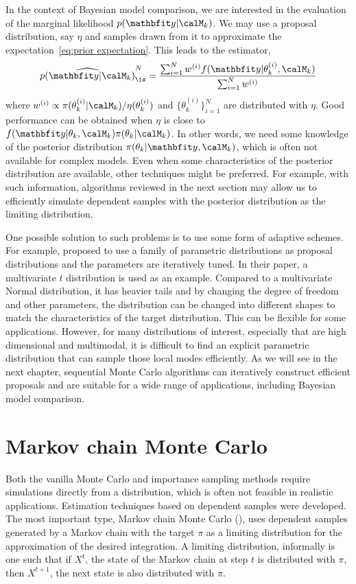 In the context of Bayesian model comparison, we are interested in the evaluation of the marginal likelihood $p(\data|\calM_k)$. We may use a proposal distribution, say $\eta$ and samples drawn from it to approximate the expectation~\eqref{eq:prior expectation}. This leads to the estimator,
\begin{equation}
  \widehat{p(\data|\calM_k)}_{\is}^N =
  \frac{\sum_{i=1}^N w^{(i)} f(\data|\theta_k^{(i)},\calM_k)}
  {\sum_{i=1}^N w^{(i)}}
\end{equation}
where $w^{(i)}\propto\pi(\theta_k^{(i)}|\calM_k)/\eta(\theta_k^{(i)})$ and $\{\theta_k^{(i)}\}_{i=1}^N$ are distributed with $\eta$. Good performance can be obtained when $\eta$ is close to $f(\data|\theta_k,\calM_k)\pi(\theta_k|\calM_k)$. In other words, we need some knowledge of the posterior distribution $\pi(\theta_k|\data,\calM_k)$, which is often not available for complex models. Even when some characteristics of the posterior distribution are available, other techniques might be preferred. For example, with such information, algorithms reviewed in the next section may allow us to efficiently simulate dependent samples with the posterior distribution as the limiting distribution.

One possible solution to such problems is to use some form of adaptive schemes. For example, \cite{ManSuk:1992vx} proposed to use a family of parametric distributions as proposal distributions and the parameters are iteratively tuned. In their paper, a multivariate $t$ distribution is used as an example. Compared to a multivariate Normal distribution, it has heavier tails and by changing the degree of freedom and other parameters, the distribution can be changed into different shapes to match the characteristics of the target distribution. This can be flexible for some applications. However, for many distributions of interest, especially that are high dimensional and multimodal, it is difficult to find an explicit parametric distribution that can sample those local modes efficiently. As we will see in the next chapter, sequential Monte Carlo algorithms can iteratively construct efficient proposals and are suitable for a wide range of applications, including Bayesian model comparison.

\section{Markov chain Monte Carlo}
\label{sec:Markov chain Monte Carlo}

Both the vanilla Monte Carlo and importance sampling methods require simulations directly from a distribution, which is often not feasible in realistic applications. Estimation techniques based on dependent samples were developed. The most important type, Markov chain Monte Carlo (\mcmc), uses dependent samples generated by a Markov chain with the target $\pi$ as a limiting distribution for the approximation of the desired integration. A limiting distribution, informally is one such that if $X^t$, the state of the Markov chain at step $t$ is distributed with $\pi$, then $X^{t+1}$, the next state is also distributed with $\pi$.

